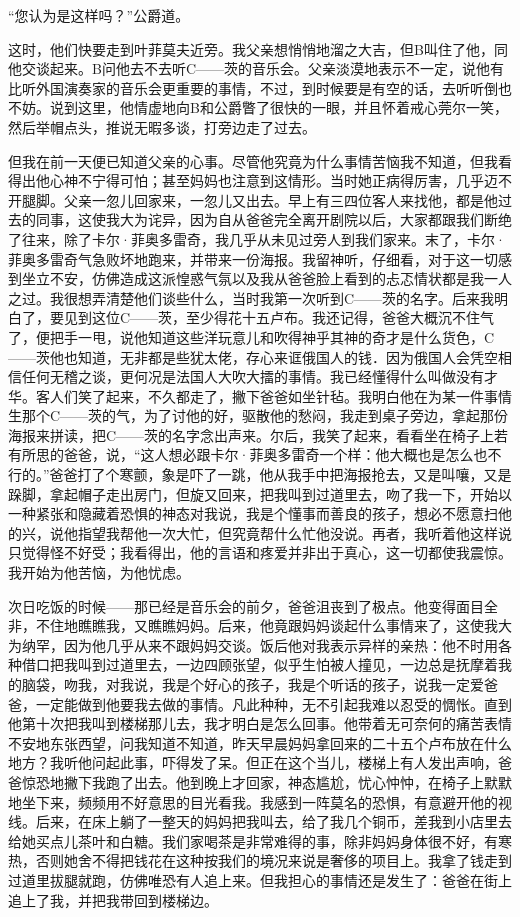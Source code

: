 \documentclass[12pt, UTF8]{ctexbook}
\begin{document}
\par “您认为是这样吗？”公爵道。
\par 这时，他们快要走到叶菲莫夫近旁。我父亲想悄悄地溜之大吉，但B叫住了他，同他交谈起来。B问他去不去听C——茨的音乐会。父亲淡漠地表示不一定，说他有比听外国演奏家的音乐会更重要的事情，不过，到时候要是有空的话，去听听倒也不妨。说到这里，他情虚地向B和公爵瞥了很快的一眼，并且怀着戒心莞尔一笑，然后举帽点头，推说无暇多谈，打旁边走了过去。
\par 但我在前一天便已知道父亲的心事。尽管他究竟为什么事情苦恼我不知道，但我看得出他心神不宁得可怕；甚至妈妈也注意到这情形。当时她正病得厉害，几乎迈不开腿脚。父亲一忽儿回家来，一忽儿又出去。早上有三四位客人来找他，都是他过去的同事，这使我大为诧异，因为自从爸爸完全离开剧院以后，大家都跟我们断绝了往来，除了卡尔·菲奥多雷奇，我几乎从未见过旁人到我们家来。末了，卡尔·菲奥多雷奇气急败坏地跑来，并带来一份海报。我留神听，仔细看，对于这一切感到坐立不安，仿佛造成这派惶惑气氛以及我从爸爸脸上看到的忐忑情状都是我一人之过。我很想弄清楚他们谈些什么，当时我第一次听到C——茨的名字。后来我明白了，要见到这位C——茨，至少得花十五卢布。我还记得，爸爸大概沉不住气了，便把手一甩，说他知道这些洋玩意儿和吹得神乎其神的奇才是什么货色，C——茨他也知道，无非都是些犹太佬，存心来诓俄国人的钱．因为俄国人会凭空相信任何无稽之谈，更何况是法国人大吹大擂的事情。我已经懂得什么叫做没有才华。客人们笑了起来，不久都走了，撇下爸爸如坐针毡。我明白他在为某一件事情生那个C——茨的气，为了讨他的好，驱散他的愁闷，我走到桌子旁边，拿起那份海报来拼读，把C——茨的名字念出声来。尔后，我笑了起来，看看坐在椅子上若有所思的爸爸，说，“这人想必跟卡尔·菲奥多雷奇一个样：他大概也是怎么也不行的。”爸爸打了个寒颤，象是吓了一跳，他从我手中把海报抢去，又是叫嚷，又是跺脚，拿起帽子走出房门，但旋又回来，把我叫到过道里去，吻了我一下，开始以一种紧张和隐藏着恐惧的神态对我说，我是个懂事而善良的孩子，想必不愿意扫他的兴，说他指望我帮他一次大忙，但究竟帮什么忙他没说。再者，我听着他这样说只觉得怪不好受；我看得出，他的言语和疼爱并非出于真心，这一切都使我震惊。我开始为他苦恼，为他忧虑。
\par 次日吃饭的时候——那已经是音乐会的前夕，爸爸沮丧到了极点。他变得面目全非，不住地瞧瞧我，又瞧瞧妈妈。后来，他竟跟妈妈谈起什么事情来了，这使我大为纳罕，因为他几乎从来不跟妈妈交谈。饭后他对我表示异样的亲热：他不时用各种借口把我叫到过道里去，一边四顾张望，似乎生怕被人撞见，一边总是抚摩着我的脑袋，吻我，对我说，我是个好心的孩子，我是个听话的孩子，说我一定爱爸爸，一定能做到他要我去做的事情。凡此种种，无不引起我难以忍受的惆怅。直到他第十次把我叫到楼梯那儿去，我才明白是怎么回事。他带着无可奈何的痛苦表情不安地东张西望，问我知道不知道，昨天早晨妈妈拿回来的二十五个卢布放在什么地方？我听他问起此事，吓得发了呆。但正在这个当儿，楼梯上有人发出声响，爸爸惊恐地撇下我跑了出去。他到晚上才回家，神态尴尬，忧心忡忡，在椅子上默默地坐下来，频频用不好意思的目光看我。我感到一阵莫名的恐惧，有意避开他的视线。后来，在床上躺了一整天的妈妈把我叫去，给了我几个铜币，差我到小店里去给她买点儿茶叶和白糖。我们家喝茶是非常难得的事，除非妈妈身体很不好，有寒热，否则她舍不得把钱花在这种按我们的境况来说是奢侈的项目上。我拿了钱走到过道里拔腿就跑，仿佛唯恐有人追上来。但我担心的事情还是发生了：爸爸在街上追上了我，并把我带回到楼梯边。
\end{document}
